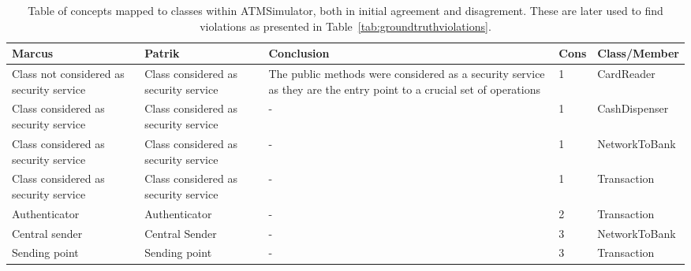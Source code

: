 \begin{table}
\begin{center}
\captionsetup{justification=centering}
\caption{Table of concepts mapped to classes within ATMSimulator, both in initial agreement and disagrement. These are later used to find violations as presented in Table~\ref{tab:groundtruthviolations}.}
\label{tab:groundtruthconceptincluded}
\hspace*{-2.7cm}
\begin{tabular}{p{3.5cm}p{3.5cm}p{3.5cm}ll}
\textbf{Marcus} & \textbf{Patrik} & \textbf{Conclusion} & \textbf{Cons} & \textbf{Class/Member} \\
\hline
Class not considered as security service & Class considered as security service & The public methods were considered as a security service as they are the entry point to a crucial set of operations & 1                   & CardReader                     \\
\rowcolor{RowColor}
Class considered as security service     & Class considered as security service & -                                                                                                              & 1                   & CashDispenser                  \\
Class considered as security service     & Class considered as security service & -                                                                                                              & 1                   & NetworkToBank                  \\
\rowcolor{RowColor}
Class considered as security service     & Class considered as security service & -                                                                                                              & 1                   & Transaction                 \\
Authenticator                            & Authenticator                        & -                                                                                                              & 2                   & Transaction                 \\
\rowcolor{RowColor}
Central sender                           & Central Sender                       & -                                                                                                              & 3                   & NetworkToBank                  \\
Sending point                            & Sending point                        & -                                                                                                              & 3                   & Transaction                 \\

\end{tabular}
\end{center}
\end{table}
